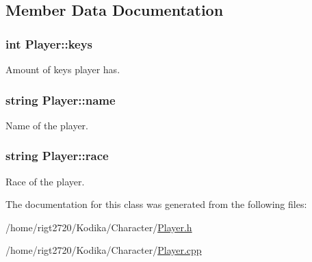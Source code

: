 \subsection{Member Data Documentation}
\hypertarget{classPlayer_ac46baa685ca2a266178f03b9e9877e65}{
\subsubsection[{keys}]{\setlength{\rightskip}{0pt plus 5cm}int Player\-::keys\hspace{0.3cm}{\ttfamily [private]}}}\label{classPlayer_ac46baa685ca2a266178f03b9e9877e65}


Amount of keys player has. 

\hypertarget{classPlayer_acf0355128a99ee20ad9931b760fb2de1}{
\subsubsection[{name}]{\setlength{\rightskip}{0pt plus 5cm}string Player\-::name\hspace{0.3cm}{\ttfamily [private]}}}\label{classPlayer_acf0355128a99ee20ad9931b760fb2de1}


Name of the player. 

\hypertarget{classPlayer_a5130cb6c4233cd7ad1212af0d1790e58}{
\subsubsection[{race}]{\setlength{\rightskip}{0pt plus 5cm}string Player\-::race\hspace{0.3cm}{\ttfamily [private]}}}\label{classPlayer_a5130cb6c4233cd7ad1212af0d1790e58}


Race of the player. 



The documentation for this class was generated from the following files\-:\begin{DoxyCompactItemize}
\item 
/home/rigt2720/\-Kodika/\-Character/\hyperlink{Player_8h}{Player.\-h}\item 
/home/rigt2720/\-Kodika/\-Character/\hyperlink{Player_8cpp}{Player.\-cpp}\end{DoxyCompactItemize}
